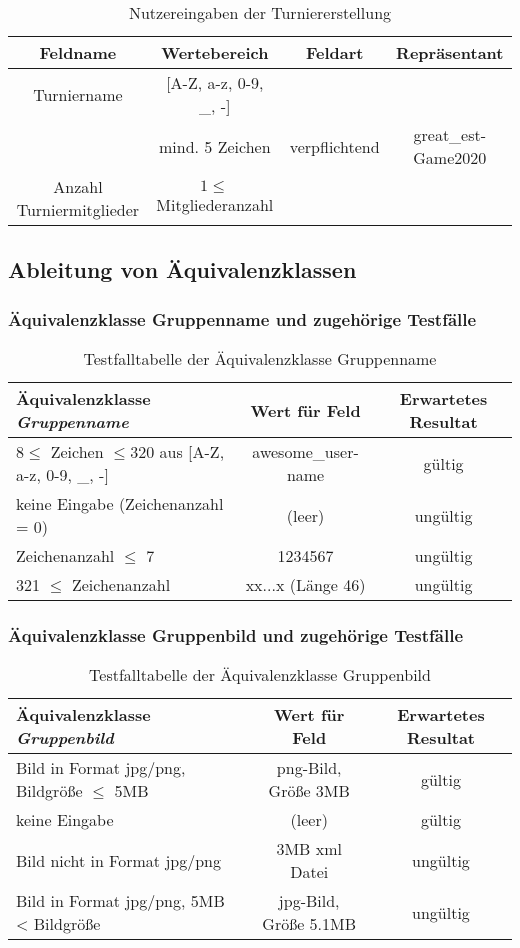 \documentclass[ngerman,12pt,titlepage]{article}
\begin{document}
				\begin{table}[H]
			\centering
			\begin{tabular}{c|c|c|c}
				\textbf{Feldname}&\textbf{Wertebereich} & \textbf{Feldart} & \textbf{Repräsentant}  \\  
				\hline
				Turniername  			& [A-Z, a-z, 0-9, \_, -] 	&&\\ 
										& mind. 5 Zeichen 			&verpflichtend& great\_est-Game2020\\ \hline 
				Anzahl Turniermitglieder&  \(1 \leq \) Mitgliederanzahl	&&\\
				
			\end{tabular}
			\caption{Nutzereingaben der Turniererstellung}
		\end{table}
		\noindent

	\subsection{Ableitung von Äquivalenzklassen}
		\subsubsection{Äquivalenzklasse Gruppenname und zugehörige Testfälle}
		\begin{table}[H]
		\centering
		\begin{tabular}{l|c|c}
			\textbf{Äquivalenzklasse \textit{Gruppenname}} &\textbf{Wert für Feld}  &\textbf {Erwartetes Resultat} \\  
			\hline
			 \(8 \leq \) Zeichen \(\leq 320\) aus [A-Z, a-z, 0-9, \_, -]  & awesome\_user-name &gültig  \\  
			keine Eingabe (Zeichenanzahl = 0)&(leer)  & ungültig \\  
			Zeichenanzahl \(\leq\) 7 & 1234567 & ungültig \\  
			321 \(\leq\) Zeichenanzahl  & xx...x (Länge 46) &ungültig  \\  
		\end{tabular}
		\caption{Testfalltabelle der Äquivalenzklasse Gruppenname}
		\end{table}
	\noindent
	\subsubsection{Äquivalenzklasse Gruppenbild und zugehörige Testfälle}
			\begin{table}[H]
		\centering
		\begin{tabular}{l|c|c}
			\textbf{Äquivalenzklasse \textit{Gruppenbild}} &\textbf{Wert für Feld}  &\textbf {Erwartetes Resultat} \\  
			\hline
			Bild in Format jpg/png, Bildgröße \(\leq\) 5MB & png-Bild, Größe 3MB &gültig  \\  
			keine Eingabe &(leer)  & gültig \\  
			Bild nicht in Format jpg/png & 3MB xml Datei & ungültig \\  
			Bild in Format jpg/png, 5MB < Bildgröße  & jpg-Bild, Größe 5.1MB &ungültig  \\  
		\end{tabular}
		\caption{Testfalltabelle der Äquivalenzklasse Gruppenbild}
	\end{table}
	\noindent
\end{document}
